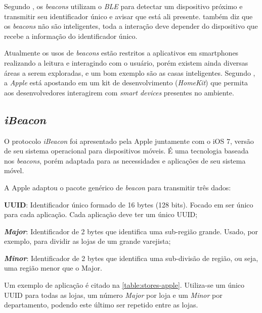 Segundo , os \textit{beacons} utilizam o \textit{BLE} para detectar um dispositivo próximo e transmitir seu identificador único e avisar que está ali presente.  também diz que os \textit{beacons} não são inteligentes, toda a interação deve depender do dispositivo que recebe a informação do identificador único.

Atualmente os usos de \textit{beacons} estão restritos a aplicativos em smartphones realizando a leitura e interagindo com o usuário, porém existem ainda diversas áreas a serem exploradas, e um bom exemplo são as casas inteligentes. Segundo , a \textit{Apple} está apostando em um kit de desenvolvimento (\textit{HomeKit}) que permita aos desenvolvedores interagirem com \textit{smart devices} presentes no ambiente.

\subsection{\textit{iBeacon}}\label{sec:ibeacon}

O protocolo \textit{iBeacon} foi apresentado pela Apple juntamente com o iOS 7, versão de seu sistema operacional para dispositivos móveis. É uma tecnologia baseada nos \textit{beacons}, porém adaptada para as necessidades e aplicações de seu sistema móvel.

A Apple adaptou o pacote genérico de \textit{beacon} para transmitir três dados:

\begin{alineas}
	\item \textbf{UUID}: Identificador único formado de 16 bytes (128 bits). Focado em ser único para cada aplicação. Cada aplicação deve ter um único UUID;
	\item \textbf{\textit{Major}}: Identificador de 2 bytes que identifica uma sub-região grande. Usado, por exemplo, para dividir as lojas de um grande varejista;
	\item \textbf{\textit{Minor}}: Identificador de 2 bytes que identifica uma sub-divisão de região, ou seja, uma região menor que o Major.
\end{alineas}

Um exemplo de aplicação é citado na \autoref{table:stores-apple}. Utiliza-se um único UUID para todas as lojas, um número \textit{Major} por loja e um \textit{Minor} por departamento, podendo este último ser repetido entre as lojas.

